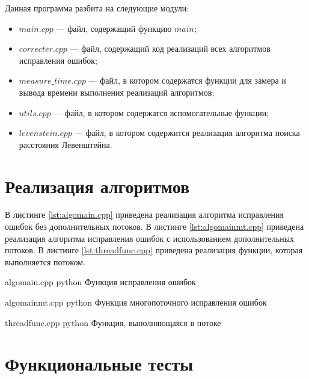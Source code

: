 Данная программа разбита на следующие модули:
\begin{itemize}
	\item $main.cpp$ --- файл, содержащий функцию $main$;
	\item $correcter.cpp$ --- файл, содержащий код реализаций всех алгоритмов исправления ошибок;
	\item $measure\_time.cpp$ --- файл, в котором содержатся функции для замера и вывода времени выполнения реализаций алгоритмов;
	\item $utils.cpp$ --- файл, в котором содержатся вспомогательные функции;
	\item $levenstein.cpp$ --- файл, в котором содержится реализация алгоритма поиска расстояния Левенштейна.
\end{itemize}

\section{Реализация алгоритмов}

В листинге \ref{lst:algomain.cpp} приведена реализация алгоритма исправления ошибок без дополнительных потоков. 
В листинге \ref{lst:algomainmt.cpp} приведена реализация алгоритма исправления ошибок с использованием дополнительных потоков.
В листинге \ref{lst:threadfunc.cpp} приведена реализация функции, которая выполняется потоком.

\clearpage
{}
{algomain.cpp} %
{python} %
{Функция исправления ошибок} %

\clearpage

{algomainmt.cpp} %
{python} %
{Функция многопоточного исправления ошибок} %

\clearpage

{threadfunc.cpp} %
{python} %
{Функция, выполняющаяся в потоке} %

\clearpage

\section{Функциональные тесты}

